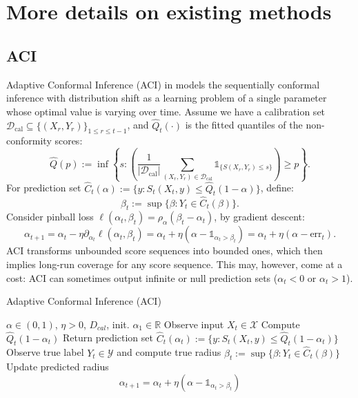 \section{More details on existing methods}
\label{More details on existing methods}
\subsection{ACI}

Adaptive Conformal Inference (ACI) in  models the sequentially conformal inference with distribution shift  as a learning problem of a single parameter whose optimal value is varying over time. Assume we have a calibration set $\mathcal{D}_{\mathrm{cal}}\subseteq\{(X_r,Y_r)\}_{1\leq r\leq t-1}$,  
and $\hat{Q}_t(\cdot)$ is  the fitted quantiles of the non-conformity scores:
$$\hat{Q}(p):=\inf\left\{s:\left(\frac1{|\mathcal{D}_{\mathrm{cal}}|}\sum_{(X_r,Y_r)\in\mathcal{D}_{\mathrm{cal}}}\mathds{1}_{\{S(X_r,Y_r)\leq s\}}\right)\geq p\right\}.$$
For prediction set $\hat{C}_t(\alpha):=\{y:S_t(X_t,y)\leq\hat{Q}_t(1-\alpha)\}$, define:$$ \beta_t:=\sup\{\beta:Y_t\in\hat{C}_t(\beta)\}.$$Consider pinball loss  $\ell(\alpha_t,\beta_t)=\rho_\alpha(\beta_t-\alpha_t)$, by gradient descent:
$$\alpha_{t+1}=\alpha_t-\eta\partial_{\alpha_t}\ell(\alpha_t,\beta_t)=\alpha_t+\eta(\alpha-\mathds{1}_{\alpha_t>\beta_t})=\alpha_t+\eta(\alpha-\text{err}_t).$$
 ACI transforms unbounded score sequences into bounded ones, which then
implies long-run coverage for any score sequence. This may, however, come at a cost: ACI can sometimes output infinite or null prediction sets ($\alpha_t<0$ or $\alpha_t>1$). 

\begin{algorithm}
\caption{Adaptive Conformal Inference (ACI)}\label{algorithm1}
\begin{algorithmic}[1]
\Require $\alpha \in (0, 1)$,  $\eta > 0$, $D_{cal}$, init. $\alpha_1 \in \mathbb{R}$
    \State Observe input $X_t \in \mathcal{X}$
    \State Compute $\hat{Q}_t(1-\alpha_t)$
    \State Return prediction set $\hat{C}_t(\alpha_t):=\{y:S_t(X_t,y)\leq\hat{Q}_t(1-\alpha_t)\}$
    \State Observe true label $Y_t \in \mathcal{Y}$ and compute true radius $\beta_t:=\sup\{\beta:Y_t\in\hat{C}_t(\beta)\}$
    \State Update predicted radius
    \[
    \alpha_{t+1}=\alpha_t+\eta(\alpha-\mathds{1}_{\alpha_t>\beta_t})
    \]
\EndFor
\end{algorithmic}
\end{algorithm}
